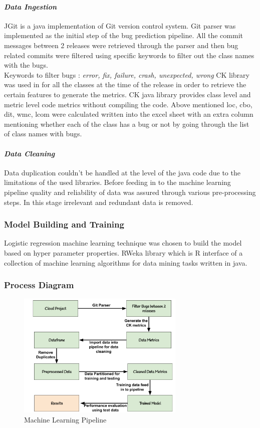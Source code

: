\documentclass{seal_article}
\begin{document}
\paragraph{\textit{Data Ingestion}}
JGit is a java implementation of Git version control system. Git parser was implemented as the initial step of the bug prediction pipeline. All the commit messages between 2 releases were retrieved through the parser and then bug related commits were filtered using specific keywords to filter out the class names with the bugs.
\\Keywords to filter bugs : 
\textit{error, fix, failure, crash, unexpected, wrong}
\vspace{\baselineskip}
\textsc{CK} \cite{ck} library was used in for all the classes at the time of the release in order to retrieve the certain features to generate the metrics. CK java library provides class level and metric level code metrics without compiling the code. Above mentioned loc, cbo, dit, wmc, lcom were calculated written into the excel sheet with an extra column mentioning whether each of the class has a bug or not by going through the list of class names with bugs.

\paragraph{\textit{Data Cleaning}}
Data duplication couldn’t be handled at the level of the java code due to the limitations of the used libraries. Before feeding in to the machine learning pipeline quality and reliability of data was assured through various pre-processing steps. In this stage irrelevant and redundant data is removed. 

\subsubsection{Model Building and Training}
Logistic regression machine learning technique was chosen to build the model based on hyper parameter properties. RWeka library which is R interface of a collection of machine learning algorithms for data mining tasks written in java. 

\subsubsection{Process Diagram}
\vspace{\baselineskip}
\begin{figure}[htp]
    \centering
    \includegraphics[width=8cm]{Process.png}
    \caption{Machine Learning Pipeline}
    \label{fig:Initial Bug }
\end{figure}
\end{document}
